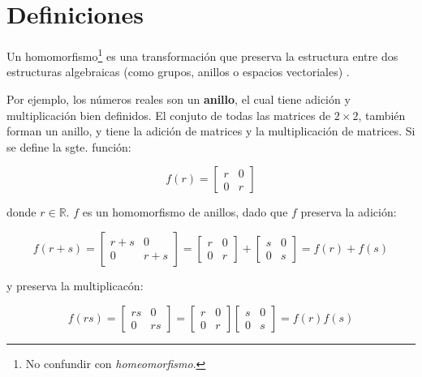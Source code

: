 \section{Definiciones}\label{sec:def}
\begin{mydef}
Un homomorfismo\footnote{No confundir con \emph{homeomorfismo}.} es una
transformaci\'on que preserva la estructura entre dos estructuras algebraicas
(como grupos, anillos o espacios vectoriales) \cite{wikiHomoM}.

Por ejemplo, los n\'umeros reales son un \textbf{anillo}, el cual tiene
adici\'on y multiplicaci\'on bien definidos. 
El conjuto de todas las matrices de $2\times 2$, tambi\'en forman un anillo, y
tiene la adici\'on de matrices y la multiplicaci\'on de matrices. 
Si se define la sgte. funci\'on:

$$f(r)=\begin{bmatrix}r & 0 \\ 0 &r\end{bmatrix}$$

donde $r \in \mathbb{R}$. $f$ es un homomorfismo de anillos, dado que $f$ preserva la adici\'on:

$$f(r+s) =  \begin{bmatrix}r+s & 0 \\ 0 &r+s\end{bmatrix} = \begin{bmatrix}r & 0 \\ 0 &r\end{bmatrix} + \begin{bmatrix}s & 0 \\ 0 &s\end{bmatrix} = f(r) + f(s)$$

y preserva la multiplicac\'on:

$$f(rs) = \begin{bmatrix}rs & 0 \\ 0 &rs\end{bmatrix} =  \begin{bmatrix}r & 0 \\ 0 &r\end{bmatrix} \begin{bmatrix}s & 0 \\ 0 &s\end{bmatrix} = f(r) f(s)$$

 


\end{mydef}



